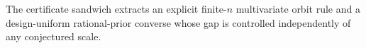The certificate sandwich extracts an explicit finite-\(n\) multivariate orbit rule and a design-uniform rational-prior converse whose gap is controlled independently of any conjectured scale.
